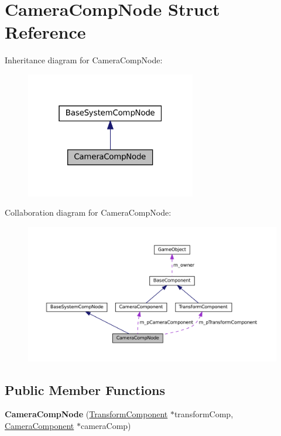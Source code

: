 \hypertarget{structCameraCompNode}{}\section{Camera\+Comp\+Node Struct Reference}
\label{structCameraCompNode}


Inheritance diagram for Camera\+Comp\+Node\+:
\nopagebreak
\begin{figure}[H]
\begin{center}
\leavevmode
\includegraphics[width=211pt]{structCameraCompNode__inherit__graph}
\end{center}
\end{figure}


Collaboration diagram for Camera\+Comp\+Node\+:
\nopagebreak
\begin{figure}[H]
\begin{center}
\leavevmode
\includegraphics[width=350pt]{structCameraCompNode__coll__graph}
\end{center}
\end{figure}
\subsection*{Public Member Functions}
\begin{DoxyCompactItemize}
\item 
\mbox{\label{structCameraCompNode_ad212f0250cd99dd43b73d9553c26cfda}} 
{\bfseries Camera\+Comp\+Node} (\hyperlink{classTransformComponent}{Transform\+Component} $\ast$transform\+Comp, \hyperlink{classCameraComponent}{Camera\+Component} $\ast$camera\+Comp)
\end{DoxyCompactItemize}
